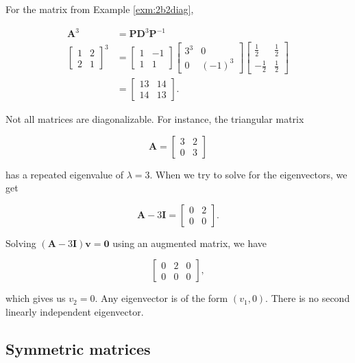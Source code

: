 \documentclass[
]{book}
\theoremstyle{definition}
\theoremstyle{definition}
\theoremstyle{definition}
\theoremstyle{definition}
\theoremstyle{remark}
\begin{document}
For the matrix from Example \ref{exm:2b2diag},

\begin{align*} \mathbf{A}^3&=\mathbf{P}\mathbf{D}^3\mathbf{P}^{-1}\\
\begin{bmatrix}1 & 2\\2 & 1\end{bmatrix}^3&=\begin{bmatrix}1 & -1\\1 & 1\end{bmatrix}\begin{bmatrix}3^3 & 0\\0 & (-1)^3\end{bmatrix}\begin{bmatrix}\frac{1}{2} & \frac{1}{2}\\-\frac{1}{2} & \frac{1}{2}\end{bmatrix}\\
&=\begin{bmatrix}13 & 14\\14 & 13\end{bmatrix}.
\end{align*}

Not all matrices are diagonalizable. For instance, the triangular matrix

\[\mathbf{A}=\begin{bmatrix}3 & 2\\0 & 3\end{bmatrix}\]

has a repeated eigenvalue of \(\lambda=3\). When we try to solve for the eigenvectors, we get

\[\mathbf{A}-3\mathbf{I}=\begin{bmatrix}0 & 2\\0 & 0\end{bmatrix}.\]

Solving \((\mathbf{A}-3\mathbf{I})\mathbf{v}=\mathbf{0}\) using an augmented matrix, we have

\[\left[\begin{array}{rr|r}0 & 2 & 0\\0 & 0 & 0\end{array}\right],\]

which gives us \(v_2=0\). Any eigenvector is of the form \((v_1,0)\). There is no second linearly independent eigenvector.

\subsection*{Symmetric matrices}\label{symmetric-matrices}
\end{document}
